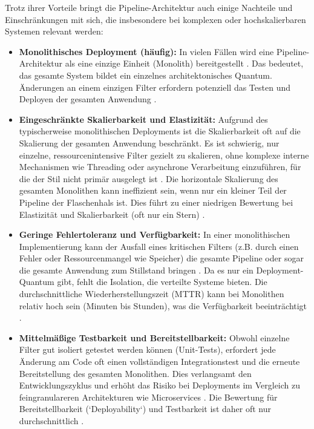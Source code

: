 \documentclass[11pt, a4paper]{article}
\begin{document}
Trotz ihrer Vorteile bringt die Pipeline-Architektur auch einige Nachteile und Einschränkungen mit sich, die insbesondere bei komplexen oder hochskalierbaren Systemen relevant werden:

\begin{itemize}
    \item \textbf{Monolithisches Deployment (häufig):} In vielen Fällen wird eine Pipeline-Architektur als eine einzige Einheit (Monolith) bereitgestellt \cite{RichardsFord2020}. Das bedeutet, das gesamte System bildet ein einzelnes architektonisches Quantum. Änderungen an einem einzigen Filter erfordern potenziell das Testen und Deployen der gesamten Anwendung \cite{RichardsFord2020}.
    \item \textbf{Eingeschränkte Skalierbarkeit und Elastizität:} Aufgrund des typischerweise monolithischen Deployments ist die Skalierbarkeit oft auf die Skalierung der gesamten Anwendung beschränkt. Es ist schwierig, nur einzelne, ressourcenintensive Filter gezielt zu skalieren, ohne komplexe interne Mechanismen wie Threading oder asynchrone Verarbeitung einzuführen, für die der Stil nicht primär ausgelegt ist \cite{RichardsFord2020}. Die horizontale Skalierung des gesamten Monolithen kann ineffizient sein, wenn nur ein kleiner Teil der Pipeline der Flaschenhals ist. Dies führt zu einer niedrigen Bewertung bei Elastizität und Skalierbarkeit (oft nur ein Stern) \cite{RichardsFord2020}.
    \item \textbf{Geringe Fehlertoleranz und Verfügbarkeit:} In einer monolithischen Implementierung kann der Ausfall eines kritischen Filters (z.B. durch einen Fehler oder Ressourcenmangel wie Speicher) die gesamte Pipeline oder sogar die gesamte Anwendung zum Stillstand bringen \cite{RichardsFord2020}. Da es nur ein Deployment-Quantum gibt, fehlt die Isolation, die verteilte Systeme bieten. Die durchschnittliche Wiederherstellungszeit (MTTR) kann bei Monolithen relativ hoch sein (Minuten bis Stunden), was die Verfügbarkeit beeinträchtigt \cite{RichardsFord2020}.
    \item \textbf{Mittelmäßige Testbarkeit und Bereitstellbarkeit:} Obwohl einzelne Filter gut isoliert getestet werden können (Unit-Tests), erfordert jede Änderung am Code oft einen vollständigen Integrationstest und die erneute Bereitstellung des gesamten Monolithen. Dies verlangsamt den Entwicklungszyklus und erhöht das Risiko bei Deployments im Vergleich zu feingranulareren Architekturen wie Microservices \cite{RichardsFord2020}. Die Bewertung für Bereitstellbarkeit (`Deployability`) und Testbarkeit ist daher oft nur durchschnittlich \cite{RichardsFord2020}.

\end{itemize}
\end{document}
